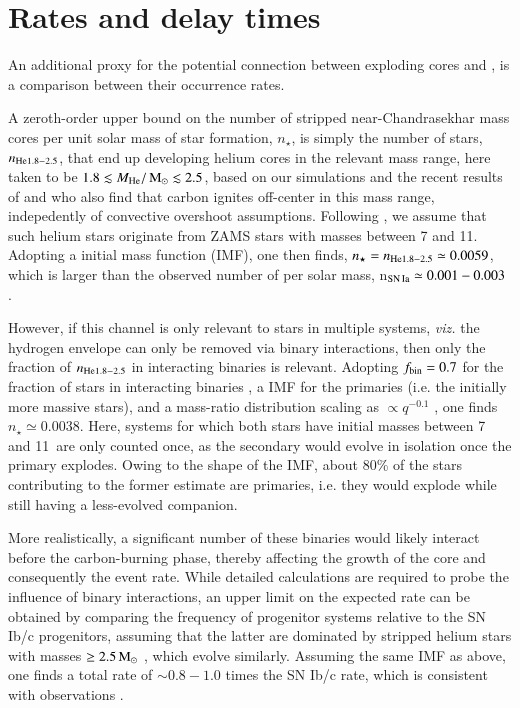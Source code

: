 \documentclass[twocolumn]{aa}
\begin{document}
\section{Rates and delay times}\label{sec:4}
An additional  proxy for the potential connection between exploding \one cores and \ia, is a comparison between their  occurrence rates. 

A zeroth-order upper bound on the number of stripped near-Chandrasekhar mass \one cores per unit solar mass of star formation, $n_\star$, is 
simply the number of stars, $n_{\rm{He}1.8-2.5}$, that end up developing  helium cores in the relevant mass range, here taken to be $1.8\lesssim M_{\rm{He}}/\mathrm{\,M_\odot} \lesssim 2.5$, based on our simulations and the recent results of \cite{Woosley:2019sdf} and \cite{Farmer:2015afs} who also find that carbon ignites off-center in this mass range, indepedently of convective overshoot assumptions. Following 
\cite{Farmer:2015afs}, we assume that such helium stars originate from ZAMS stars with masses between 7 and 11\msun. Adopting a \cite{Chabrier:2004vw} initial mass function (IMF), one then finds,  $n_\star=n_{\rm{He}1.8-2.5}\simeq 0.0059$, which is larger than the observed number of \ias per solar mass, n$_{\rm SN\,Ia}\simeq 0.001-0.003$ \citep[e.g][]{claeys2014a,Maoz:2013hna}.

However, if this channel is only relevant to stars in multiple systems, {\it viz.} the hydrogen envelope can only be removed via binary 
interactions, then only the fraction of $n_{\rm{He}1.8-2.5}$ in interacting binaries is relevant. 
Adopting $f_{\rm bin}=0.7$ for the fraction of stars in interacting binaries \citep{Sana:2012px}, a \cite{Chabrier:2004vw} IMF for the primaries (i.e. the 
initially more massive stars), and a mass-ratio distribution scaling as $\propto q^{-0.1}$ \citep{Sana:2012px}, one finds $n_\star \simeq 0.0038$. Here, systems for which both stars have initial masses between 7 and 11\msun\ are only counted once, as the secondary would evolve in isolation once the primary explodes. Owing to the shape of the IMF, about 80\% of the stars contributing to the former estimate are primaries, i.e. they would explode while still having a less-evolved companion. 

 More realistically, a significant number of these binaries would likely interact before the carbon-burning phase, thereby affecting the growth of the core and consequently the event rate. While detailed  calculations are required to probe the influence  of binary interactions, an upper limit on the expected rate can be obtained by comparing  the frequency of progenitor systems  relative to  the SN Ib/c progenitors, assuming that the latter are dominated by stripped helium stars with masses $\ge 2.5\mathrm{\,M_\odot}$ \citep{Woosley:2019sdf}, which evolve similarly. Assuming the same IMF as above, one finds a total rate of $\sim 0.8-1.0$ times the SN Ib/c rate, which is consistent with observations \citep[][and references therein]{branch2017}. 
\end{document}
